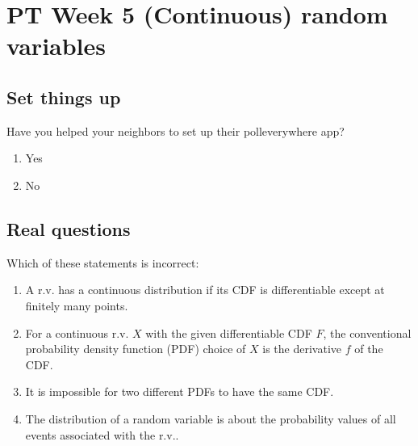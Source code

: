 \documentclass[poll_tutorial_format]{subfiles}
\begin{document}
	\maketitle
	
	\setcounter{section}{4}
	\section{PT Week 5 (Continuous) random variables}
	
	\subsection{Set things up}
	\label{sec:set-things-up}
	
	
	
	\setcounter{theorem}{-1}
	\begin{exercise}
		Have you helped your neighbors to set up their polleverywhere app? 
		\begin{enumerate}
			\item Yes
			\item No
		\end{enumerate}
	\end{exercise}
	
	\subsection{Real questions}
	\label{sec:start-real-questions pt week 5}
	
		
	
 
	
	
	\begin{exercise}
		Which of these statements is incorrect: 
		\begin{enumerate}
			\item A r.v. has a continuous distribution if its CDF is differentiable except at finitely many points.   
			\item For a continuous r.v. $X$ with the given differentiable CDF
			$F$, the conventional probability density function (PDF) choice of $X$ is the derivative $f$ of the CDF.
			\item It is impossible for two different PDFs to have the same CDF.
			\item The distribution of a random variable is about the probability values of all events associated with the r.v..
		\end{enumerate}
	\end{exercise}
	
\end{document}
